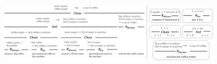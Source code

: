 \documentclass[a4paper,11pt]{article}
\begin{document}
    \begin{figure}
        \centering
        \includegraphics[width=1\linewidth]{coffee with rules.png} 
        \caption{
        }
        \label{fig:coffee}
    \end{figure}
    
\end{document}
